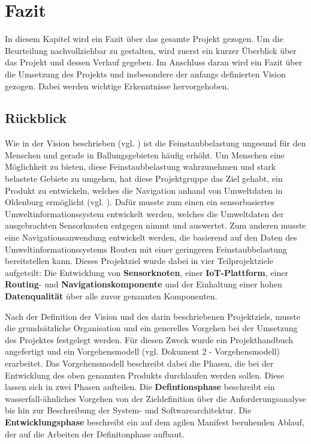 \chapter{Fazit}
In diesem Kapitel wird ein Fazit über das gesamte Projekt gezogen. Um die Beurteilung nachvollziehbar zu gestalten, wird zuerst ein kurzer Überblick über das Projekt und dessen Verlauf gegeben.
Im Anschluss daran wird ein Fazit über die Umsetzung des Projekts und insbesondere der anfangs definierten Vision gezogen. 
Dabei werden wichtige Erkenntnisse hervorgehoben.
\section{Rückblick}

Wie in der Vision beschrieben (vgl. ) ist die Feinstaubbelastung ungesund für den Menschen und gerade in Ballungsgebieten häufig erhöht. 
Um Menschen eine Möglichkeit zu bieten, diese Feinstaubbelastung wahrzunehmen und stark belastete Gebiete zu umgehen, hat diese Projektgruppe das Ziel gehabt, ein Produkt zu entwickeln, welches die Navigation anhand von Umweltdaten in Oldenburg ermöglicht (vgl. ). 
Dafür musste zum einen ein sensorbasiertes Umweltinformationssystem entwickelt werden, welches die Umweltdaten der ausgebrachten Sensorknoten entgegen nimmt und auswertet. 
Zum anderen musste eine Navigationsanwendung entwickelt werden, die basierend auf den Daten des Umweltinformationssystems Routen mit einer geringeren Feinstaubbelastung bereitstellen kann.
Dieses Projektziel wurde dabei in vier Teilprojektziele aufgeteilt: 
Die Entwicklung von \textbf{Sensorknoten}, einer \textbf{IoT-Plattform}, einer \textbf{Routing}- und \textbf{Navigationskomponente} und der Einhaltung einer hohen \textbf{Datenqualität} über alle zuvor genannten Komponenten.

Nach der  Definition der Vision und des darin beschriebenen Projektziels, musste die grundsätzliche Organisation und ein generelles Vorgehen bei der Umsetzung des Projektes festgelegt werden. 
Für diesen Zweck wurde ein Projekthandbuch angefertigt und ein Vorgehensmodell (vgl. Dokument 2 - Vorgehensmodell) erarbeitet. 
Das Vorgehensmodell beschreibt dabei die Phasen, die bei der Entwicklung des oben genannten Produkts durchlaufen werden sollen. 
Diese lassen sich in zwei Phasen aufteilen.
Die \textbf{Defintionsphase} beschreibt ein wasserfall-ähnliches Vorgehen von der Zieldefinition über die Anforderungsanalyse bis hin zur Beschreibung der System- und Softwarearchitektur. 
Die \textbf{Entwicklungsphase} beschreibt ein auf dem agilen Manifest beruhenden Ablauf, der auf die Arbeiten der Definitonphase aufbaut.

